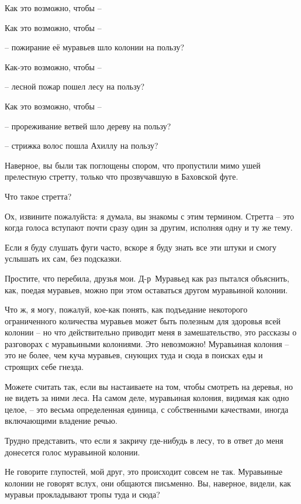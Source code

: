 \documentclass[../main.tex]{subfiles}
\begin{document}
\begin{dialogue}
 Как это возможно, чтобы \---

 Как это возможно, чтобы \---

 \--- пожирание её муравьев шло колонии на пользу?

 Как-это возможно, чтобы \---

 \--- лесной пожар пошел лесу на пользу?

 Как это возможно, чтобы \---

 \--- прореживание ветвей шло дереву на пользу?

 \--- стрижка волос пошла Ахиллу на пользу?

 Наверное, вы были так поглощены спором, что пропустили мимо ушей прелестную стретту, только что прозвучавшую в Баховской фуге.

 Что такое стретта?

 Ох, извините пожалуйста: я думала, вы знакомы с этим термином. Стретта \--- это когда голоса вступают почти сразу один за другим, исполняя одну и ту же тему.

 Если я буду слушать фуги часто, вскоре я буду знать все эти штуки и смогу услышать их сам, без подсказки.

 Простите, что перебила, друзья мои. Д-р~Муравьед как раз пытался объяснить, как, поедая муравьев, можно при этом оставаться другом муравьиной колонии.

 Что ж, я могу, пожалуй, кое-как понять, как подъедание некоторого ограниченного количества муравьев может быть полезным для здоровья всей колонии \--- но что действительно приводит меня в замешательство, это рассказы о разговорах с муравьиными колониями. Это невозможно! Муравьиная колония \--- это не более, чем куча муравьев, снующих туда и сюда в поисках еды и строящих себе гнезда.

 Можете считать так, если вы настаиваете на том, чтобы смотреть на деревья, но не видеть за ними леса. На самом деле, муравьиная колония, видимая как одно целое, \--- это весьма определенная единица, с собственными качествами, иногда включающими владение речью.

 Трудно представить, что если я закричу где-нибудь в лесу, то в ответ до меня донесется голос муравьиной колонии.

 Не говорите глупостей, мой друг, это происходит совсем не так. Муравьиные колонии не говорят вслух, они общаются письменно. Вы, наверное, видели, как муравьи прокладывают тропы туда и сюда?


\end{dialogue}
\end{document}
